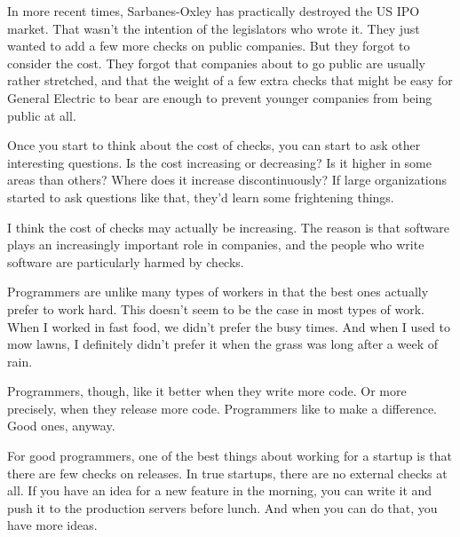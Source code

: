 In more
                  recent times, Sarbanes-Oxley has practically destroyed the US
                  IPO market. That wasn't the intention of the legislators who
                  wrote it. They just wanted to add a few more checks on public
                  companies. But they forgot to consider the cost. They forgot
                  that companies about to go public are usually rather
                  stretched, and that the weight of a few extra checks that
                  might be easy for General Electric to bear are enough to
                  prevent younger companies from being public at all.

Once
                  you start to think about the cost of checks, you can start to
                  ask other interesting questions. Is the cost increasing or
                  decreasing? Is it higher in some areas than others? Where does
                  it increase discontinuously? If large organizations started to
                  ask questions like that, they'd learn some frightening
                  things.

I think the cost of checks may actually be
                  increasing. The reason is that software plays an increasingly
                  important role in companies, and the people who write software
                  are particularly harmed by checks.

Programmers are
                  unlike many types of workers in that the best ones actually
                  prefer to work hard. This doesn't seem to be the case in most
                  types of work. When I worked in fast food, we didn't prefer
                  the busy times. And when I used to mow lawns, I definitely
                  didn't prefer it when the grass was long after a week of
                  rain.

Programmers, though, like it better when they
                  write more code. Or more precisely, when they release more
                  code. Programmers like to make a difference. Good ones,
                  anyway.

For good programmers, one of the best
                  things about working for a startup is that there are few
                  checks on releases. In true startups, there are no external
                  checks at all. If you have an idea for a new feature in the
                  morning, you can write it and push it to the production
                  servers before lunch. And when you can do that, you have more
                  ideas.

